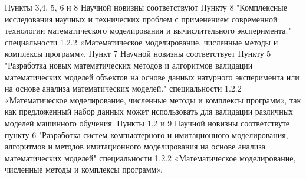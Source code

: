 {\appropriation}
Пункты 3,4, 5, 6 и 8 Научной новизны соответствуют Пункту 8 "Комплексные исследования научных и технических проблем с применением современной технологии математического моделирования и
вычислительного эксперимента." специальности 1.2.2 «Математическое моделирование, численные методы и комплексы программ». Пункт 7 Научной новизны соответствует Пункту 5 "Разработка новых математических методов и алгоритмов валидации математических моделей объектов на основе данных натурного эксперимента или на основе анализа математических моделей." специальности 1.2.2 «Математическое моделирование, численные методы и комплексы программ», так как предложенный набор данных может использовать для валидации различных моделей машинного обучения. Пункты 1,2 и 9 Научной новизны соответствуте пункту 6 "Разработка систем компьютерного и имитационного моделирования, алгоритмов и методов имитационного моделирования на основе анализа математических моделей" специальности 1.2.2 «Математическое моделирование, численные методы и комплексы программ».

